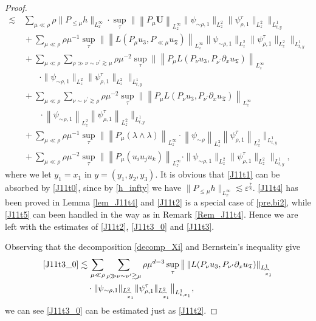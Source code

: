 \documentclass[11pt,letterpaper,reqno]{amsart}
\numberwithin{equation}{section}
\theoremstyle{definition}
\theoremstyle{remark}
\begin{document}
\begin{proof}
\begin{align}
		\lesssim&\,   	\sum_{\mu \ll \rho}   \rho  \|P_{\leq \mu} h\|_{L^\infty_x}  \cdot  \sup_{\tau} \big\|\left\|P_{\mu} \mathbf{U}  \right\|_{L^\infty_z} \|  \psi_{\sim \rho,1}  \|_{L^2_z}   \|    \psi_{\rho,1}^\tau \|_{L^2_z}   \big\|_{L^1_{t,y}}\label{J11t1}\\
	&\, + 	\sum_{\mu \ll \rho} \rho \mu^{-1} \sup_\tau \big\|\left\|L(P_\mu u_3, P_{\ll \mu } u_{\mathfrak{T}}) \right\|_{L^\infty_z} \|    \psi_{\sim \rho,1} \|_{L^2_z}   \|    \psi_{\rho,1}^\tau \|_{L^2_z}   \big\|_{L^1_{t,y}} \label{J11t2}\\
  &\, +	\sum_{\mu \ll \rho} \sum_{\rho \gg \nu\sim \nu^\prime \gtrsim \mu}   \rho \mu^{-2} \sup_{\tau}\big\|\left\| P_\mu L (P_\nu u_3, P_{\nu^\prime} \partial_x u_{\mathfrak{T}} ) \right\|_{L^\infty_z}\label{J11t3_0}\\
 &\quad\quad\cdot\|   \psi_{\sim \rho,1} \|_{L^2_z}   \| \psi_{\rho,1}^\tau\|_{L^2_z}   \big\|_{L^1_{t,y}}\nonumber\\
 &\, +	\sum_{\mu \ll \rho} \sum_{\nu\sim \nu^\prime \gtrsim \rho} \rho \mu^{-2}  \sup_{\tau}\big\|\left\| P_\mu  L (P_\nu u_3, P_{\nu^\prime} \partial_x u_{\mathfrak{T}} ) \right\|_{L^\infty_z}\label{J11t3}\\
 &\quad\quad\cdot\left\|  \psi_{\sim \rho,1} \right\|_{L^2_z}   \left\|   \psi_{\rho,1}^\tau \right\|_{L^2_z}   \big\|_{L^1_{t,y}}\nonumber\\
	&\,  +	\sum_{\mu \ll \rho}  \rho  \mu^{-1} 
 \sup_{\tau} \big\|\left\|P_{\mu}(\lambda\wedge\lambda)\right\|_{L^\infty_z} \cdot\left\|   \psi _{\sim \rho}\right\|_{L^2_z}   \left\| \psi_{\rho,1}^\tau\right\|_{L^2_z}   \big\|_{L^1_{t,y}} \label{J11t4}\\
	&\, + 	\sum_{\mu \ll \rho}  \rho \mu^{-2} \sup_{\tau} \big\|\left\|P_{\mu}(u_i u_j u_k)\right\|_{L^\infty_z} \cdot\|   \psi_{\sim \rho,1}\|_{L^2_z}   \|    \psi_{\rho,1}^\tau\|_{L^2_z}   \big\|_{L^1_{t,y}}, \label{J11t5}
\end{align}
where we let \(y_1=x_1\) in \(y=(y_1,y_2,y_3)\).
It is obvious that  \eqref{J11t1} can be absorbed  by  \eqref{J11t0}, since by \eqref{h_infty} we have $ \|P_{\leq \mu} h\|_{L^\infty_x}\lesssim \varepsilon^{\frac 78} $. 
\eqref{J11t4} has been proved  in Lemma \ref{lem_J11t4} and \eqref{J11t2} is a special case of \eqref{pre.bi2},  while  \eqref{J11t5} can been handled in the way as in Remark \ref{Rem_J11t4}.
Hence we are left with the estimates of \eqref{J11t2}, \eqref{J11t3_0} and \eqref{J11t3}.

 
Observing that the decomposition \eqref{decomp_Xi} and  Bernstein's inequality give
\begin{align*}
    \eqref{J11t3_0}  
 \lesssim &\, 	\sum_{\mu \ll \rho } \sum_{\rho \gg \nu\sim \nu^\prime \gtrsim \mu}   \rho \mu^{d-3} \sup_{\tau } \big\|\left\| L (P_\nu u_3, P_{\nu^\prime} \partial_x u_{\mathfrak{T}} ) \right\|_{L^1_{\widehat{x}_1}}\nonumber\\
 &\cdot \|     \psi_{\sim \rho ,1}  \|_{L^2_{\widehat{x}_1}}   \|  \psi_{\rho,1}^{\tau } \|_{L^2_{\widehat{x}_1}}   \big\|_{L^1_{t,x_1}}, 
\end{align*}
we can see  \eqref{J11t3_0} can be estimated just as \eqref{J11t2}.



\end{proof}
\end{document}
